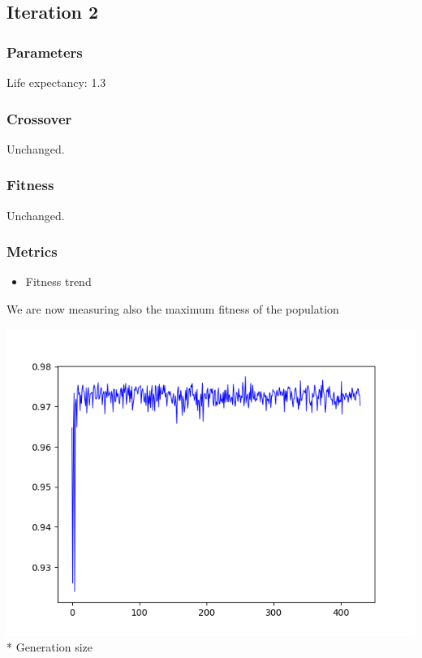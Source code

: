 \documentclass[11pt]{article}
\makeatletter
\def\maxwidth{\ifdim\Gin@nat@width>\linewidth\linewidth
    \else\Gin@nat@width\fi}
\let\Oldincludegraphics\includegraphics
\renewcommand{\includegraphics}[1]{\Oldincludegraphics[width=.8\maxwidth]{#1}}
\providecommand{\tightlist}{%
      \setlength{\itemsep}{0pt}\setlength{\parskip}{0pt}}
\makeatother
\begin{document}
    \hypertarget{iteration-2}{%
\subsection{Iteration 2}\label{iteration-2}}

\hypertarget{parameters}{%
\subsubsection{Parameters}\label{parameters}}

Life expectancy: 1.3

\hypertarget{crossover}{%
\subsubsection{Crossover}\label{crossover}}

Unchanged.

\hypertarget{fitness}{%
\subsubsection{Fitness}\label{fitness}}

Unchanged.

\hypertarget{metrics}{%
\subsubsection{Metrics}\label{metrics}}

\begin{itemize}
\tightlist
\item
  Fitness trend
\end{itemize}

We are now measuring also the maximum fitness of the population

\includegraphics{gfx/fitness-trend-tne-2.png} * Generation size
\end{document}
